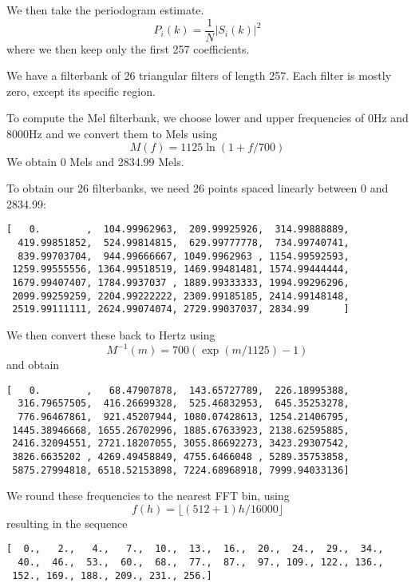 \documentclass{article}
\begin{document}
We then take the periodogram estimate.
\begin{equation}
P_i(k) = \frac{1}{N}\left|S_i(k)\right|^2
\end{equation}
where we then keep only the first 257 coefficients.

We have a filterbank of 26 triangular filters of length 257. Each filter is mostly zero, except its specific region.

To compute the Mel filterbank, we choose lower and upper frequencies of 0Hz and 8000Hz and we convert them to Mels using
\begin{equation}
M(f) = 1125\ln\left(1 + f/700\right)
\end{equation}
We obtain 0 Mels and 2834.99 Mels.

To obtain our 26 filterbanks, we need 26 points spaced linearly between 0 and 2834.99:
\begin{verbatim}
[   0.        ,  104.99962963,  209.99925926,  314.99888889,
  419.99851852,  524.99814815,  629.99777778,  734.99740741,
  839.99703704,  944.99666667, 1049.9962963 , 1154.99592593,
 1259.99555556, 1364.99518519, 1469.99481481, 1574.99444444,
 1679.99407407, 1784.9937037 , 1889.99333333, 1994.99296296,
 2099.99259259, 2204.99222222, 2309.99185185, 2414.99148148,
 2519.99111111, 2624.99074074, 2729.99037037, 2834.99      ]
\end{verbatim}

We then convert these back to Hertz using
\begin{equation}
M^{-1}(m) = 700\left(\exp\left(m/1125\right)-1\right)
\end{equation}
and obtain
\begin{verbatim}
[   0.        ,   68.47907878,  143.65727789,  226.18995388,
  316.79657505,  416.26699328,  525.46832953,  645.35253278,
  776.96467861,  921.45207944, 1080.07428613, 1254.21406795,
 1445.38946668, 1655.26702996, 1885.67633923, 2138.62595885,
 2416.32094551, 2721.18207055, 3055.86692273, 3423.29307542,
 3826.6635202 , 4269.49458849, 4755.6466048 , 5289.35753858,
 5875.27994818, 6518.52153898, 7224.68968918, 7999.94033136]
\end{verbatim}

We round these frequencies to the nearest FFT bin, using
\begin{equation}
f(h) = \lfloor(512+1)h/16000\rfloor
\end{equation}
resulting in the sequence
\begin{verbatim}
[  0.,   2.,   4.,   7.,  10.,  13.,  16.,  20.,  24.,  29.,  34.,
  40.,  46.,  53.,  60.,  68.,  77.,  87.,  97., 109., 122., 136.,
 152., 169., 188., 209., 231., 256.]
\end{verbatim}
\end{document}
